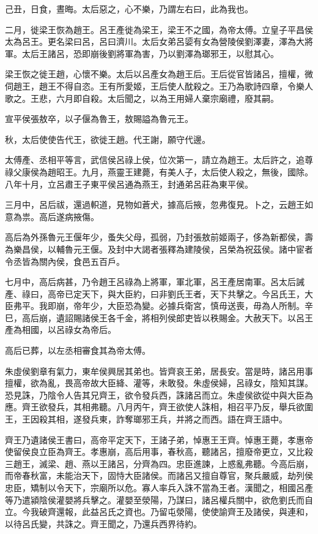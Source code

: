 己丑，日食，晝晦。太后惡之，心不樂，乃謂左右曰，此為我也。

二月，徙梁王恢為趙王。呂王產徙為梁王，梁王不之國，為帝太傅。立皇子平昌侯太為呂王。更名梁曰呂，呂曰濟川。太后女弟呂媭有女為營陵侯劉澤妻，澤為大將軍。太后王諸呂，恐即崩後劉將軍為害，乃以劉澤為瑯邪王，以慰其心。

梁王恢之徙王趙，心懷不樂。太后以呂產女為趙王后。王后從官皆諸呂，擅權，微伺趙王，趙王不得自恣。王有所愛姬，王后使人酖殺之。王乃為歌詩四章，令樂人歌之。王悲，六月即自殺。太后聞之，以為王用婦人棄宗廟禮，廢其嗣。

宣平侯張敖卒，以子偃為魯王，敖賜謚為魯元王。

秋，太后使使告代王，欲徙王趙。代王謝，願守代邊。

太傅產、丞相平等言，武信侯呂祿上侯，位次第一，請立為趙王。太后許之，追尊祿父康侯為趙昭王。九月，燕靈王建薨，有美人子，太后使人殺之，無後，國除。八年十月，立呂肅王子東平侯呂通為燕王，封通弟呂莊為東平侯。

三月中，呂后祓，還過軹道，見物如蒼犬，據高后掖，忽弗復見。卜之，云趙王如意為祟。高后遂病掖傷。

高后為外孫魯元王偃年少，蚤失父母，孤弱，乃封張敖前姬兩子，侈為新都侯，壽為樂昌侯，以輔魯元王偃。及封中大謁者張釋為建陵侯，呂榮為祝茲侯。諸中宦者令丞皆為關內侯，食邑五百戶。

七月中，高后病甚，乃令趙王呂祿為上將軍，軍北軍，呂王產居南軍。呂太后誡產、祿曰，高帝已定天下，與大臣約，曰非劉氏王者，天下共擊之。今呂氏王，大臣弗平。我即崩，帝年少，大臣恐為變。必據兵衛宮，慎毋送喪，毋為人所制。辛巳，高后崩，遺詔賜諸侯王各千金，將相列侯郎吏皆以秩賜金。大赦天下。以呂王產為相國，以呂祿女為帝后。

高后已葬，以左丞相審食其為帝太傅。

朱虛侯劉章有氣力，東牟侯興居其弟也。皆齊哀王弟，居長安。當是時，諸呂用事擅權，欲為亂，畏高帝故大臣絳、灌等，未敢發。朱虛侯婦，呂祿女，陰知其謀。恐見誅，乃陰令人告其兄齊王，欲令發兵西，誅諸呂而立。朱虛侯欲從中與大臣為應。齊王欲發兵，其相弗聽。八月丙午，齊王欲使人誅相，相召平乃反，舉兵欲圍王，王因殺其相，遂發兵東，詐奪瑯邪王兵，并將之而西。語在齊王語中。

齊王乃遺諸侯王書曰，高帝平定天下，王諸子弟，悼惠王王齊。悼惠王薨，孝惠帝使留侯良立臣為齊王。孝惠崩，高后用事，春秋高，聽諸呂，擅廢帝更立，又比殺三趙王，滅梁、趙、燕以王諸呂，分齊為四。忠臣進諫，上惑亂弗聽。今高后崩，而帝春秋富，未能治天下，固恃大臣諸侯。而諸呂又擅自尊官，聚兵嚴威，劫列侯忠臣，矯制以令天下，宗廟所以危。寡人率兵入誅不當為王者。漢聞之，相國呂產等乃遣潁陰侯灌嬰將兵擊之。灌嬰至滎陽，乃謀曰，諸呂權兵關中，欲危劉氏而自立。今我破齊還報，此益呂氏之資也。乃留屯滎陽，使使諭齊王及諸侯，與連和，以待呂氏變，共誅之。齊王聞之，乃還兵西界待約。

